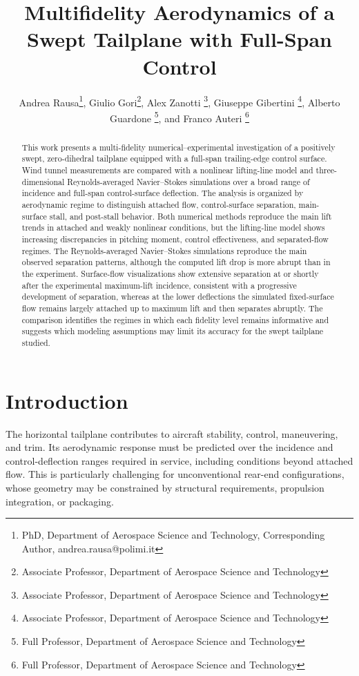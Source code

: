 \documentclass[journal ]{new-aiaa}
\title{Multifidelity Aerodynamics of a Swept Tailplane with Full-Span Control}
\author{Andrea Rausa\footnote{PhD, Department of Aerospace Science and Technology, Corresponding Author, andrea.rausa@polimi.it}, Giulio Gori\footnote{Associate Professor, Department of Aerospace Science and Technology}, Alex Zanotti \footnote{Associate Professor, Department of Aerospace Science and Technology}, Giuseppe Gibertini \footnote{Associate Professor, Department of Aerospace Science and Technology}, Alberto Guardone \footnote{Full Professor, Department of Aerospace Science and Technology}, and Franco Auteri \footnote{Full Professor, Department of Aerospace Science and Technology}}
\affil{Politecnico di Milano, Department of Aerospace Science and Technology, Milano, Italy, 20154}
\begin{document}
\maketitle

\begin{abstract}
This work presents a multi-fidelity numerical--experimental investigation of a positively swept, zero-dihedral tailplane equipped with a full-span trailing-edge control surface.
Wind tunnel measurements are compared with a nonlinear lifting-line model and three-dimensional Reynolds-averaged Navier--Stokes simulations over a broad range of incidence and full-span control-surface deflection.
The analysis is organized by aerodynamic regime to distinguish attached flow, control-surface separation, main-surface stall, and post-stall behavior.
Both numerical methods reproduce the main lift trends in attached and weakly nonlinear conditions, but the lifting-line model shows increasing discrepancies in pitching moment, control effectiveness, and separated-flow regimes.
The Reynolds-averaged Navier--Stokes simulations reproduce the main observed separation patterns, although the computed lift drop is more abrupt than in the experiment.
Surface-flow visualizations show extensive separation at or shortly after the experimental maximum-lift incidence, consistent with a progressive development of separation, whereas at the lower deflections the simulated fixed-surface flow remains largely attached up to maximum lift and then separates abruptly.
The comparison identifies the regimes in which each fidelity level remains informative and suggests which modeling assumptions may limit its accuracy for the swept tailplane studied.
\end{abstract}







\section{Introduction}
\label{sec:introduction}

The horizontal tailplane contributes to aircraft stability, control, maneuvering, and trim. Its aerodynamic response must be predicted over the incidence and control-deflection ranges required in service, including conditions beyond attached flow. This is particularly challenging for unconventional rear-end configurations, whose geometry may be constrained by structural requirements, propulsion integration, or packaging.
\end{document}
